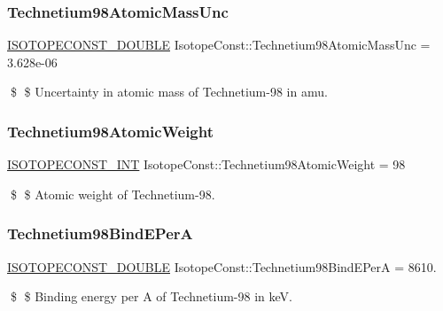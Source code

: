 \subsubsection{\texorpdfstring{Technetium98\+Atomic\+Mass\+Unc}{Technetium98AtomicMassUnc}}
{\footnotesize\ttfamily \mbox{\hyperlink{group___isotope_const-_macros_ga8f45a7272ce02c0b4c65c44636ed719a}{I\+S\+O\+T\+O\+P\+E\+C\+O\+N\+S\+T\+\_\+\+D\+O\+U\+B\+LE}} Isotope\+Const\+::\+Technetium98\+Atomic\+Mass\+Unc = 3.\+628e-\/06}

\$ \$ Uncertainty in atomic mass of Technetium-\/98 in amu. \mbox{\label{group___isotope_const-_technetium-_tc98_ga5aa36791f5a705ed28d5039cec62d818}} 
\subsubsection{\texorpdfstring{Technetium98\+Atomic\+Weight}{Technetium98AtomicWeight}}
{\footnotesize\ttfamily \mbox{\hyperlink{group___isotope_const-_macros_ga5f18360b3e99483a35c32d789e62621c}{I\+S\+O\+T\+O\+P\+E\+C\+O\+N\+S\+T\+\_\+\+I\+NT}} Isotope\+Const\+::\+Technetium98\+Atomic\+Weight = 98}

\$ \$ Atomic weight of Technetium-\/98. \mbox{\label{group___isotope_const-_technetium-_tc98_gaeaeb74873c0a73d010833e981d399ff7}} 
\subsubsection{\texorpdfstring{Technetium98\+Bind\+E\+PerA}{Technetium98BindEPerA}}
{\footnotesize\ttfamily \mbox{\hyperlink{group___isotope_const-_macros_ga8f45a7272ce02c0b4c65c44636ed719a}{I\+S\+O\+T\+O\+P\+E\+C\+O\+N\+S\+T\+\_\+\+D\+O\+U\+B\+LE}} Isotope\+Const\+::\+Technetium98\+Bind\+E\+PerA = 8610.}

\$ \$ Binding energy per A of Technetium-\/98 in keV. \mbox{\label{group___isotope_const-_technetium-_tc98_ga5a9efd0581f948d4e450083a3b141a7e}} 
